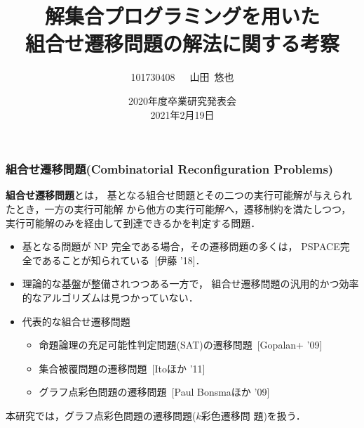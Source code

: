 \documentclass[dvipdfmx,11pt]{beamer}
\title[ASPを用いた組合せ遷移問題の解法に関する考察]{解集合プログラミングを用いた\\組合せ遷移問題の解法に関する考察}
\author{101730408~~~山田~悠也}
\date{2020年度卒業研究発表会\\2021年2月19日}
\institute{番原研究室}
\begin{document}
\begin{frame}\frametitle{}
  \titlepage
\end{frame}

\begin{frame}\frametitle{組合せ遷移問題(Combinatorial Reconfiguration Problems)}

  \begin{alertblock}{}
    \alert{\bf 組合せ遷移問題}とは，
    基となる組合せ問題とその二つの実行可能解が与えられたとき，一方の実行可能解
    から他方の実行可能解へ，遷移制約を満たしつつ，
    実行可能解のみを経由して到達できるかを判定する問題．
  \end{alertblock}

  \begin{itemize}
    \item 基となる問題が NP 完全である場合，その遷移問題の多くは，
      \alert{PSPACE完全}であることが知られている~[伊藤 '18]．
    \item 理論的な基盤が整備されつつある一方で，
      組合せ遷移問題の\alert{汎用的かつ効率的なアルゴリズムは見つかっていない}．
    \item 代表的な組合せ遷移問題
      \begin{itemize}
      \item 命題論理の充足可能性判定問題(SAT)の遷移問題~[Gopalan+ '09]
      \item 集合被覆問題の遷移問題~[Itoほか '11]
      \item グラフ点彩色問題の遷移問題~[Paul Bonsmaほか '09]
      \end{itemize}
  \end{itemize}
  \begin{alertblock}{}\centering
    本研究では，グラフ点彩色問題の遷移問題(\alert{$k$彩色遷移問
      題})を扱う．
  \end{alertblock}

  
\end{frame}
\end{document}
